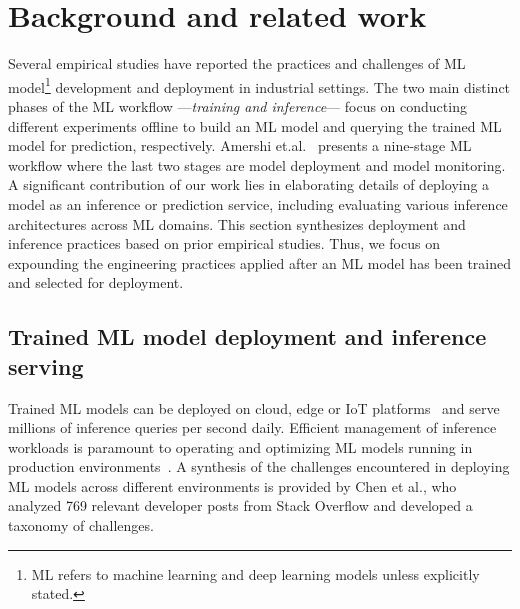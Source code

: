 \section{Background and related work}
\label{sec: background and related work}

Several empirical studies have reported the practices and challenges of ML model\footnote{ML refers to machine learning and deep learning models unless explicitly stated.} development and deployment in industrial settings. The two main distinct phases of the ML workflow ---\textit{training and inference}--- focus on conducting different experiments offline to build an ML model and querying the trained ML model for prediction, respectively. Amershi et.al.~\cite{amershi2019software} presents a nine-stage ML workflow where the last two stages are model deployment and model monitoring. A significant contribution of our work lies in elaborating details of deploying a model as an inference or prediction service, including evaluating various inference architectures across ML domains. This section synthesizes deployment and inference practices based on prior empirical studies. Thus, we focus on expounding the engineering practices applied after an ML model has been trained and selected for deployment.

\subsection{Trained ML model deployment and inference serving}
\label{subsec: trained ML model deployment}
Trained ML models can be deployed on cloud, edge or IoT platforms~\cite{Hazelwood-FB, Wu-FB-edge} and serve millions of inference queries per second daily. Efficient management of inference workloads is paramount to operating and optimizing ML models running in production environments~\cite{Park, Boroumand}. A synthesis of the challenges encountered in deploying ML models across different environments is provided by Chen et al.\cite{Chen}, who analyzed 769 relevant developer posts from Stack Overflow and developed a taxonomy of challenges.


